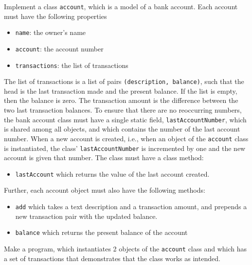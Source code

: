 Implement a class \lstinline{account}, which is a model of a bank account. Each account must have the following properties
\begin{itemize}
\item \lstinline{name}: the owner's name
\item \lstinline{account}: the account number 
\item \lstinline{transactions}: the list of transactions
\end{itemize}
The list of transactions is a list of pairs \lstinline{(description, balance)}, such that the head is the last transaction made and the present balance. If the list is empty, then the balance is zero. The transaction amount is the difference between the two last transaction balances.  To ensure that there are no reoccurring numbers, the bank account class must have a single static field, \lstinline{lastAccountNumber}, which is shared among all objects, and which contains the number of the last account number. When a new account is created, i.e., when an object of the \lstinline{account} class is instantiated, the class' \lstinline{lastAccountNumber} is incremented by one and the new account is given that number.
The class must have a class method:
\begin{itemize}
\item \lstinline{lastAccount} which returns the value of the last account created.
\end{itemize}
Further, each account object must also have the following methods:
\begin{itemize}
\item \lstinline{add} which takes a text description and a transaction amount, and prepends a new transaction pair with the updated balance.
\item \lstinline{balance} which returns the present balance of the account
\end{itemize}
Make a program, which instantiates 2 objects of the \lstinline{account} class and which has a set of transactions that demonstrates that the class works as intended.